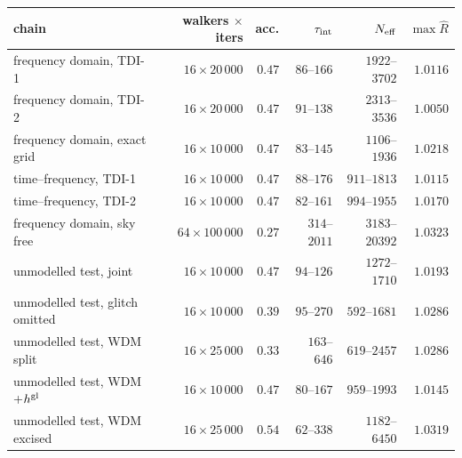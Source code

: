 \begin{tabular}{lrrrrr}
\hline\hline
chain & walkers $\times$ iters & acc. & $\tau_{\rm int}$ & $N_{\rm eff}$ & $\max\hat R$ \\
\hline
frequency domain, TDI-1 & $16\times20\,000$ & $0.47$ & $86$--$166$ & $1922$--$3702$ & $1.0116$ \\
frequency domain, TDI-2 & $16\times20\,000$ & $0.47$ & $91$--$138$ & $2313$--$3536$ & $1.0050$ \\
frequency domain, exact grid & $16\times10\,000$ & $0.47$ & $83$--$145$ & $1106$--$1936$ & $1.0218$ \\
time--frequency, TDI-1 & $16\times10\,000$ & $0.47$ & $88$--$176$ & $911$--$1813$ & $1.0115$ \\
time--frequency, TDI-2 & $16\times10\,000$ & $0.47$ & $82$--$161$ & $994$--$1955$ & $1.0170$ \\
frequency domain, sky free & $64\times100\,000$ & $0.27$ & $314$--$2011$ & $3183$--$20392$ & $1.0323$ \\
unmodelled test, joint & $16\times10\,000$ & $0.47$ & $94$--$126$ & $1272$--$1710$ & $1.0193$ \\
unmodelled test, glitch omitted & $16\times10\,000$ & $0.39$ & $95$--$270$ & $592$--$1681$ & $1.0286$ \\
unmodelled test, WDM split & $16\times25\,000$ & $0.33$ & $163$--$646$ & $619$--$2457$ & $1.0286$ \\
unmodelled test, WDM {+}$h^{\rm gl}$ & $16\times10\,000$ & $0.47$ & $80$--$167$ & $959$--$1993$ & $1.0145$ \\
unmodelled test, WDM excised & $16\times25\,000$ & $0.54$ & $62$--$338$ & $1182$--$6450$ & $1.0319$ \\
\hline\hline
\end{tabular}
